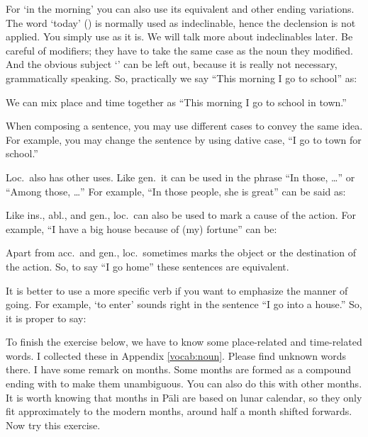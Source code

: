 For `in the morning' you can also use its equivalent  and other ending variations. The word `today' () is normally used as indeclinable, hence the declension is not applied. You simply use as it is. We will talk more about indeclinables later. Be careful of modifiers; they have to take the same case as the noun they modified. And the obvious subject `' can be left out, because it is really not necessary, grammatically speaking. So, practically we say ``This morning I go to school'' as:


We can mix place and time together as ``This morning I go to school in town.''


When composing a sentence, you may use different cases to convey the same idea. For example, you may change the sentence by using dative case, ``I go to town for school.'' 


Loc.\ also has other uses. Like gen.\ it can be used in the phrase ``In those, \ldots'' or ``Among those, \ldots'' For example, ``In those people, she is great'' can be said as:


Like ins., abl., and gen., loc.\ can also be used to mark a cause of the action. For example, ``I have a big house because of (my) fortune'' can be:


Apart from acc.\ and gen., loc.\ sometimes marks the object or the destination of the action. So, to say ``I go home'' these sentences are equivalent.


It is better to use a more specific verb if you want to emphasize the manner of going. For example,  `to enter' sounds right in the sentence ``I go into a house.'' So, it is proper to say:


To finish the exercise below, we have to know some place-related and time-related words. I collected these in Appendix \ref{vocab:noun}. Please find unknown words there. I have some remark on months. Some months are formed as a compound ending with  to make them unambiguous. You can also do this with other months. It is worth knowing that months in P\=ali are based on lunar calendar, so they only fit approximately to the modern months, around half a month shifted forwards. Now try this exercise.

